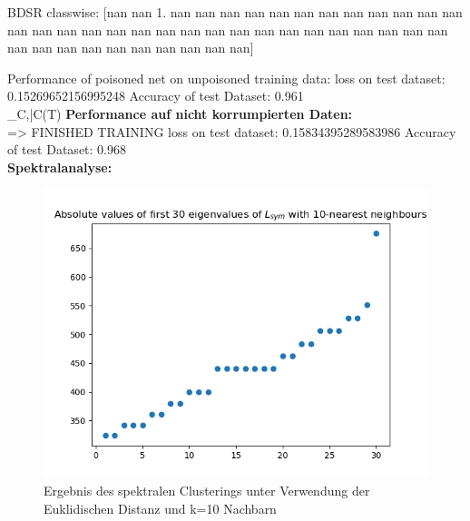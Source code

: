 \documentclass[twoside, 12pt,a4paper]{article}
\numberwithin{equation}{section}
\begin{document}
	BDSR classwise:
	[nan nan  1. nan nan nan nan nan nan nan nan nan nan nan nan nan nan nan
	nan nan nan nan nan nan nan nan nan nan nan nan nan nan nan nan nan nan
	nan nan nan nan nan nan nan]
	
	Performance of poisoned net on unpoisoned training data:
	loss on test dataset: 0.15269652156995248
	Accuracy of test Dataset: 0.961 \\

	\mathcal{\varepsilon}_{C,\bar{C}}(T)
	\noindent \textbf{Performance auf nicht korrumpierten Daten:}\\
	=>	FINISHED TRAINING
	loss on test dataset: 0.15834395289583986
	Accuracy of test Dataset: 0.968 \\
	
	
	
	\noindent \textbf{Spektralanalyse:}
	
	\begin{figure}[h]
	\begin{center}
		\includegraphics[width=0.5\textheight]{specClustering_l2_k10.png}
		\caption{Ergebnis des spektralen Clusterings unter Verwendung der Euklidischen Distanz und k=10 Nachbarn}
	\end{center}
	\end{figure}
	
\end{document}
